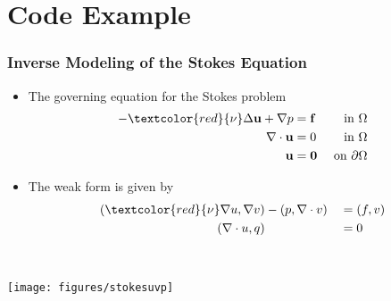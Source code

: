 \documentclass[usenames,dvipsnames]{beamer}
\begin{document}
\section{Code Example}


\begin{frame}
	\frametitle{Inverse Modeling of the Stokes Equation}
	
	\begin{itemize}
		\item The governing equation for the Stokes problem
		$$\begin{aligned} -\textcolor{red}{\nu}\Delta \mathbf{u} + \nabla p &= \mathbf{f} & \text{ in } \Omega \\ \nabla \cdot \mathbf{u} &= 0 & \text{ in } \Omega \\ \mathbf{u} &= \mathbf{0} & \text{ on } \partial \Omega \end{aligned}$$
	\end{itemize}
	
	
	\begin{minipage}[c]{0.7\textwidth}
		\begin{itemize}
			\item The weak form is given by 
			\begin{equation*}
			\begin{aligned}
			(\textcolor{red}{\nu} \nabla u, \nabla v) &- (p, \nabla \cdot v) &&= (f, v)\\
			(\nabla \cdot u, q) & &&= 0
			\end{aligned}
			\end{equation*}
		\end{itemize}
	\end{minipage}~
	\begin{minipage}[c]{0.29\textwidth}
		\texttt{[image: figures/stokesuvp]}
	\end{minipage}
	
	
\end{frame}
\end{document}
